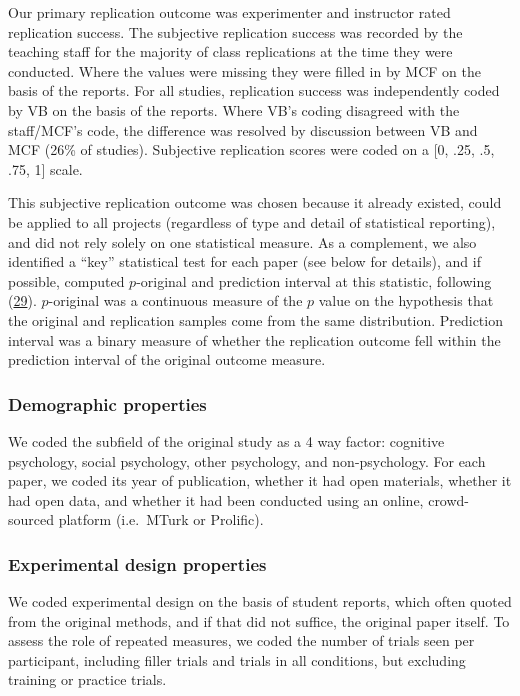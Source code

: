 \documentclass[
  english,
  a4paper,
]{article}
\begin{document}
Our primary replication outcome was experimenter and instructor rated replication success. The subjective replication success was recorded by the teaching staff for the majority of class replications at the time they were conducted. Where the values were missing they were filled in by MCF on the basis of the reports. For all studies, replication success was independently coded by VB on the basis of the reports. Where VB's coding disagreed with the staff/MCF's code, the difference was resolved by discussion between VB and MCF (26\% of studies). Subjective replication scores were coded on a {[}0, .25, .5, .75, 1{]} scale.

This subjective replication outcome was chosen because it already existed, could be applied to all projects (regardless of type and detail of statistical reporting), and did not rely solely on one statistical measure. As a complement, we also identified a ``key'' statistical test for each paper (see below for details), and if possible, computed \(p\)-original and prediction interval at this statistic, following (\protect\hyperlink{ref-mathur2020}{29}). \(p\)-original was a continuous measure of the \(p\) value on the hypothesis that the original and replication samples come from the same distribution. Prediction interval was a binary measure of whether the replication outcome fell within the prediction interval of the original outcome measure.

\hypertarget{demographic-properties}{%
\subsubsection{Demographic properties}\label{demographic-properties}}

We coded the subfield of the original study as a 4 way factor: cognitive psychology, social psychology, other psychology, and non-psychology. For each paper, we coded its year of publication, whether it had open materials, whether it had open data, and whether it had been conducted using an online, crowd-sourced platform (i.e.~MTurk or Prolific).

\hypertarget{experimental-design-properties}{%
\subsubsection{Experimental design properties}\label{experimental-design-properties}}

We coded experimental design on the basis of student reports, which often quoted from the original methods, and if that did not suffice, the original paper itself. To assess the role of repeated measures, we coded the number of trials seen per participant, including filler trials and trials in all conditions, but excluding training or practice trials.
\end{document}
